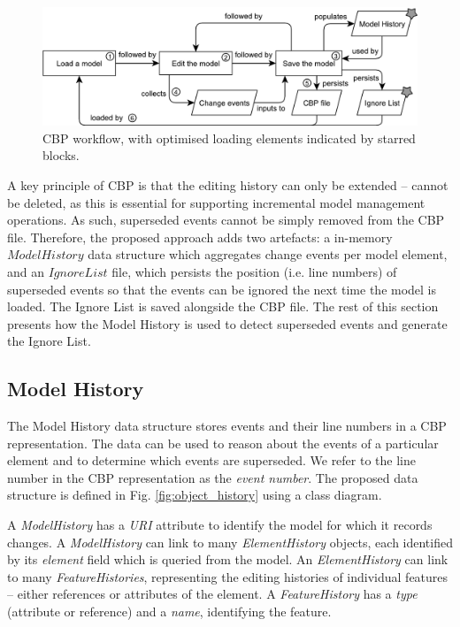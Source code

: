 \documentclass{llncs}
\begin{document}
\vspace{-15pt}
\begin{figure}[ht]
\centering
\includegraphics[width=\linewidth]{flowchart}
\caption{CBP workflow, with optimised loading elements indicated by starred blocks.}
\label{fig:flowchart}
\end{figure}

\vspace{-10pt}
A key principle of CBP is that the editing history can only be extended -- cannot be deleted, as this is essential for supporting incremental model management operations. As such, superseded events cannot be simply removed from the CBP file. Therefore, the proposed approach adds two artefacts: a in-memory $Model History$ data structure which aggregates change events per model element, and an $Ignore List$ file, which persists the position (i.e. line numbers) of superseded events so that the events can be ignored the next time the model is loaded. The Ignore List is saved alongside the CBP file. The rest of this section presents how the Model History is used to detect superseded events and generate the Ignore List.

\vspace{-15pt}
\subsection{Model History}
\label{subsec:model_history}

\vspace{-10pt}
The Model History data structure stores events and their line numbers in a CBP representation.  The data can be used to reason about the events of a particular element and to determine which events are superseded.  We refer to the line number in the CBP representation as the \emph{event number}. The proposed data structure is defined in Fig. \ref{fig:object_history} using a class diagram.  

A \emph{ModelHistory} has a \emph{URI} attribute to identify the model for which it records changes.  A \emph{ModelHistory} can link to many \emph{ElementHistory} objects, each identified by its \emph{element} field which is queried from the model. An \emph{ElementHistory} can link to many \emph{FeatureHistories}, representing the editing histories of individual features -- either references or attributes of the element. A \emph{FeatureHistory} has a \emph{type} (attribute or reference) and a \emph{name}, identifying the feature.
\end{document}
